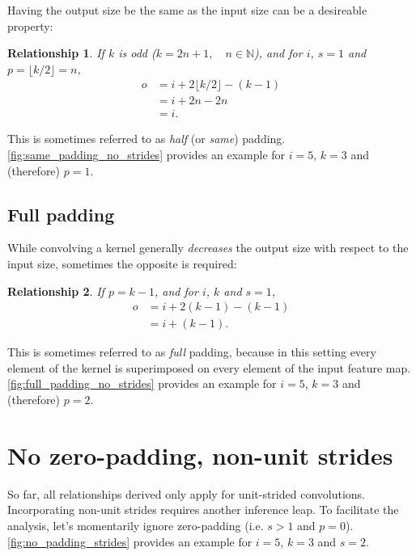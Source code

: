 \documentclass{report}
\newtheorem{relationship}{Relationship}
\begin{document}
Having the output size be the same as the input size can be a desireable
property:

\begin{relationship}\label{rel:same_padding_no_strides}
If $k$ is odd ($k = 2n + 1, \quad n \in \mathbb{N}$), and for $i$, $s = 1$ and
$p = \lfloor k / 2 \rfloor = n$,
\begin{equation*}
\begin{split}
    o &= i + 2 \lfloor k / 2 \rfloor - (k - 1) \\
      &= i + 2n - 2n \\
      &= i.
\end{split}
\end{equation*}
\end{relationship}

This is sometimes referred to as {\em half} (or {\em same}) padding.
\autoref{fig:same_padding_no_strides} provides an example for $i = 5$, $k = 3$
and (therefore) $p = 1$.

\subsection{Full padding}

While convolving a kernel generally {\em decreases} the output size with respect
to the input size, sometimes the opposite is required:

\begin{relationship}\label{rel:full_padding_no_strides}
If $p = k - 1$, and for $i$, $k$ and $s = 1$,
\begin{equation*}
\begin{split}
    o &= i + 2(k - 1) - (k - 1) \\
      &= i + (k - 1).
\end{split}
\end{equation*}
\end{relationship}

This is sometimes referred to as {\em full} padding, because in this setting
every element of the kernel is superimposed on every element of the input
feature map. \autoref{fig:full_padding_no_strides} provides an example for $i =
5$, $k = 3$ and (therefore) $p = 2$.

\section{No zero-padding, non-unit strides}

So far, all relationships derived only apply for unit-strided convolutions.
Incorporating non-unit strides requires another inference leap. To facilitate
the analysis, let's momentarily ignore zero-padding (i.e.  $s > 1$ and $p = 0$).
\autoref{fig:no_padding_strides} provides an example for $i = 5$, $k = 3$ and $s
= 2$.
\end{document}
